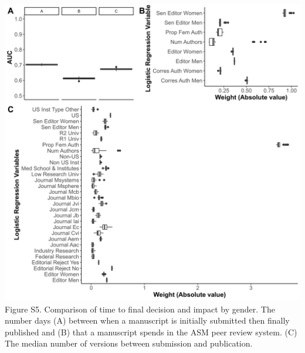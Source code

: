 \documentclass[11pt,]{article}
\begin{document}
\newpage

\includegraphics{Figure_S5.png} Figure S5. Comparison of time to final
decision and impact by gender. The number days (A) between when a
manuscript is initially submitted then finally published and (B) that a
manuscript spends in the ASM peer review system. (C) The median number
of versions between submission and publication.

\newpage
\end{document}
